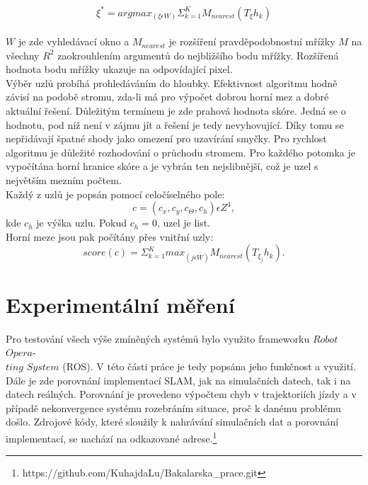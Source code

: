 \documentclass[12pt]{report}
\begin{document}
\begin{equation}
\xi^*=argmax_{(\xi\epsilon W)}\Sigma_{k=1}^KM_{nearest}(T_{\xi}h_k)
\end{equation}\\
$W$ je zde vyhledávací okno a $M_{nearest}$ je rozšíření pravděpodobnostní mřížky $M$ na všechny $R^2$ zaokrouhlením argumentů do nejbližšího bodu mřížky. Rozšířená hodnota bodu mřížky ukazuje na odpovídající pixel.\\
\indent Výběr uzlů probíhá prohledáváním do hloubky. Efektivnost algoritmu hodně závisí na podobě stromu, zda-li má pro výpočet dobrou horní mez a dobré aktuální řešení. Důležitým termínem je zde prahová hodnota skóre. Jedná se o hodnotu, pod níž není v zájmu jít a řešení je tedy nevyhovující. Díky tomu se nepřidávají špatné shody jako omezení pro uzavírání smyčky. Pro rychlost algoritmu je důležité rozhodování o průchodu stromem. Pro každého potomka je vypočítána horní hranice skóre a je vybrán ten nejslibnější, což je uzel s největším mezním počtem.\\
\indent Každý z uzlů je popsán pomocí celočíselného pole: 
\begin{equation}
c=(c_x,c_y,c_\Theta,c_h)\epsilon Z^4,
\end{equation}
kde $c_h$ je výška uzlu. Pokud $c_h=0$, uzel je list.\\
\indent Horní meze jsou pak počítány přes vnitřní uzly: 
\begin{equation}
score(c)=\Sigma_{k=1}^Kmax_{(j\epsilon \bar{W})}M_{nearest}(T_{\xi_j}h_k).
\end{equation}

\newpage

\chapter{Experimentální měření}
Pro testování všech výše zmíněných systémů bylo využito frameworku $Robot$ $Opera$-\\$ting$ $System$ (ROS). V této části práce je tedy popsána jeho funkčnost a využití. Dále je zde porovnání implementací SLAM, jak na simulačních datech, tak i na datech reálných. Porovnání je provedeno výpočtem chyb v trajektoriích jízdy a v případě nekonvergence systému rozebráním situace, proč k danému problému došlo. Zdrojové kódy, které sloužily k nahrávání simulačních dat a porovnání implementací, se nachází na odkazované adrese.\footnote{https://github.com/KuhajdaLu/Bakalarska\_prace.git}
\end{document}
